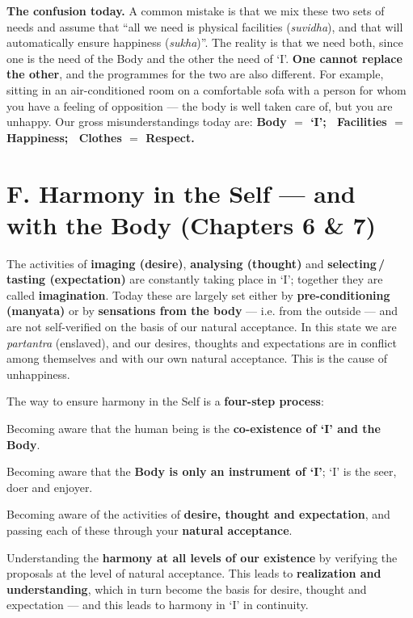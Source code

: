 \textbf{The confusion today.} A common mistake is that we mix these two sets
of needs and assume that ``all we need is physical facilities (\emph{suvidha}),
and that will automatically ensure happiness (\emph{sukha})''. The reality is
that we need both, since one is the need of the Body and the other the need of
`I'. \textbf{One cannot replace the other}, and the programmes for the two are
also different. For example, sitting in an air-conditioned room on a
comfortable sofa with a person for whom you have a feeling of opposition ---
the body is well taken care of, but you are unhappy. Our gross
misunderstandings today are: \textbf{Body $=$ `I'; \ Facilities $=$ Happiness;
\ Clothes $=$ Respect.}

\section{F. Harmony in the Self --- and with the Body (Chapters 6 \& 7)}


\ans The activities of \textbf{imaging (desire)}, \textbf{analysing (thought)}
and \textbf{selecting\,/\,tasting (expectation)} are constantly taking place
in `I'; together they are called \textbf{imagination}. Today these are largely
set either by \textbf{pre-conditioning (manyata)} or by \textbf{sensations
from the body} --- i.e. from the outside --- and are not self-verified on the
basis of our natural acceptance. In this state we are \emph{partantra}
(enslaved), and our desires, thoughts and expectations are in conflict among
themselves and with our own natural acceptance. This is the cause of
unhappiness.

The way to ensure harmony in the Self is a \textbf{four-step process}:

\begin{apts}
\item Becoming aware that the human being is the \textbf{co-existence of `I'
      and the Body}.
\item Becoming aware that the \textbf{Body is only an instrument of `I'}; `I'
      is the seer, doer and enjoyer.
\item Becoming aware of the activities of \textbf{desire, thought and
      expectation}, and passing each of these through your \textbf{natural
      acceptance}.
\item Understanding the \textbf{harmony at all levels of our existence} by
      verifying the proposals at the level of natural acceptance. This leads
      to \textbf{realization and understanding}, which in turn become the
      basis for desire, thought and expectation --- and this leads to harmony
      in `I' in continuity.
\end{apts}

